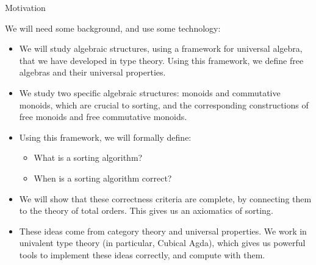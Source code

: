 \documentclass[9pt]{beamer}
\begin{document}
\begin{frame}{Motivation}

  We will need some background, and use some technology:

\begin{itemize}

  \item We will study algebraic structures, using a framework for \alert{universal algebra}, that we have developed in type theory. Using this framework, we define free algebras and their universal properties.

  \item We study two specific algebraic structures: \alert{monoids} and \alert{commutative monoids}, which are crucial to sorting, and the corresponding constructions of \alert{free monoids} and \alert{free commutative monoids}.

  \item Using this framework, we will formally define:
    \begin{itemize}
        \item What is a sorting algorithm?
        \item When is a sorting algorithm correct?
    \end{itemize}

  \item We will show that these correctness criteria are complete, by connecting them to the theory of \alert{total orders}. This gives us an \alert{axiomatics of sorting}.

  \item These ideas come from category theory and universal properties. We work in univalent type theory (in particular, \alert{Cubical Agda}), which gives us powerful tools to implement these ideas correctly, and compute with them.
  

\end{itemize}

\end{frame}
\end{document}
